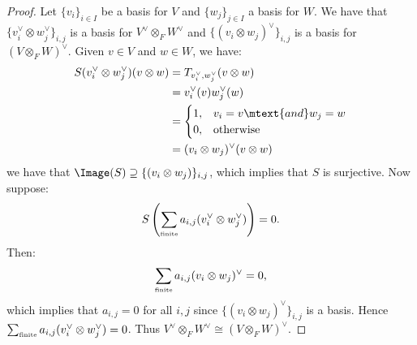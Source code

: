 \documentclass[10pt,twoside,openany]{memoir}
\begin{document}
\begin{proof}
            Let $\{v_i\}_{i \in I}$ be a basis for $V$ and $\{w_j\}_{j \in I}$ a basis for $W$. We have that $\{v_i^\vee \otimes w_j^\vee\}_{i,j}$ is a basis for $V^\vee \otimes_F W^\vee$ and $\{(v_i \otimes w_j)^\vee \}_{i,j}$ is a basis for $(V \otimes_F W)^\vee$. Given $v \in V$ and $w \in W$, we have:
                \begin{equation*}
                \begin{split}
                    S(v_i^\vee \otimes w_j^\vee)(v \otimes w)
                    & = T_{{v_i^\vee},{w_j^\vee}}(v \otimes w) \\
                    & = v_i^\vee (v)w_j^\vee(w) \\
                    & = \begin{cases} 1, & v_i = v \mtext{and} w_j = w \\ 0, & \text{otherwise}\end{cases} \\
                    & = (v_i \otimes w_j)^\vee
                    (v \otimes w)
                \end{split}
                \end{equation*}
            we have that $\Image(S) \supseteq \{(v_i \otimes w_j)\}_{i,j}$, which implies that $S$ is surjective. Now suppose:
                \begin{equation*}
                \begin{split}
                    S\left(\sum_{\text{\tiny finite}}a_{i,j} (v_i^\vee \otimes w_j ^\vee) \right) = 0.
                \end{split}
                \end{equation*}
            Then:
                \begin{equation*}
                \begin{split}
                    \sum_{\text{\tiny finite}}a_{i,j}(v_i \otimes w_j)^\vee = 0,
                \end{split}
                \end{equation*}
            which implies that $a_{i,j} = 0$ for all $i,j$ since $\{(v_i \otimes w_j)^\vee \}_{i,j}$ is a basis. Hence $\sum_{\text{\tiny finite}}a_{i,j} (v_i^\vee \otimes w_j ^\vee) = 0$. Thus $V^\vee \otimes_F W^\vee \cong (V \otimes_F W)^\vee$.
        \end{proof}
\end{document}
